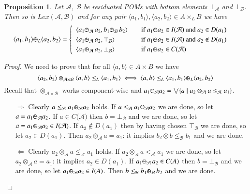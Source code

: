 \documentclass[a4paper]{elsarticle}
\newtheorem{proposition}{Proposition}
\newcommand{\1}{\mathbf{1}}
\def\odiv{{ \ominus\hspace{-8pt}:}\;}
\begin{document}
\begin{proposition}\label{def:resBI}
Let $\mathcal{A}$, $\mathcal{B}$ be residuated POMs with bottom elements $\bot_\mathcal{A}$ and $\bot_\mathcal{B}$.
%
Then so is $Lex(\mathcal{A}, \mathcal{B})$ and for any pair $\langle a_1, b_1\rangle, \langle a_2, b_2\rangle \in A \times_L B$
we have 
\[
	\langle a_1, b_1\rangle \odiv_L \langle a_2, b_2\rangle = 	\begin{cases}
	\begin{array}{lcl}
	\langle a_1 \odiv_\mathcal{A} \, a_2, b_1  \odiv_\mathcal{B} \, b_2\rangle 
	& & \mbox{if  }  a_1 \odiv a_2 \in I(\mathcal{A}) \mbox{ and } a_2 \in D(a_1)\\
	\langle a_1 \odiv_\mathcal{A} \, a_2, \top_\mathcal{B} \rangle 
	& & \mbox{if  } a_1 \odiv a_2 \in I(\mathcal{A}) \mbox{ and } a_2 \not \in D(a_1) \\
	\langle a_1 \odiv_\mathcal{A} \, a_2, \bot_\mathcal{B} \rangle 
	& & \mbox{if  }  a_1 \odiv a_2 \in C(\mathcal{A}) 
	\end{array}
	\end{cases}
\]
\end{proposition}
\begin{proof}
We need to prove that for all $\langle a, b\rangle \in A\times B$ we have
$$\langle a_2, b_2\rangle \otimes_{\mathcal{A} \times \mathcal{B}} \langle a, b\rangle \leq_L \langle a_1, b_1\rangle
\iff \langle a, b\rangle \leq_L  \langle a_1, b_1\rangle \odiv_L \langle a_2, b_2\rangle$$
%
Recall that $\otimes_{\mathcal{A} \times \mathcal{B}}$ works component-wise and 
$a_1 \odiv_\mathcal{A} a_2 = \bigvee \{a \mid a_2 \otimes_\mathcal{A} a \leq_\mathcal{A} a_1\}$.

\begin{itemize}
\item[$\Rightarrow$] Clearly $a \leq_\mathcal{A} a_1 \odiv_\mathcal{A} a_2$ holds.
If $a <_\mathcal{A} a_1 \odiv_\mathcal{A} a_2$ we are done, so let 
$a = a_1 \odiv_\mathcal{A} a_2$. If $a \in C(\mathcal{A)}$ then 
$b = \bot_\mathcal{B}$ and we are done, so let $a = a_1 \odiv_\mathcal{A} a_2 \in I(\mathcal{A)}$.
If $a_2 \not \in D(a_1)$ then by having chosen $\top_\mathcal{B}$ we are done, so let $a_2 \in D(a_1)$.
Then $a_2 \otimes_\mathcal{A} a = a_1$: it implies $b_2 \otimes b \leq_\mathcal{B} b_1$
and we are done.

\item[$\Leftarrow$]
Clearly $a_2 \otimes_\mathcal{A} a \leq_\mathcal{A} a_1$ holds.
If $a_2 \otimes_\mathcal{A} a <_\mathcal{A} a_1$ we are done, so let 
$a_2 \otimes_\mathcal{A} a = a_1$: it implies $a_2 \in D(a_1)$.
If $a_1 \odiv_\mathcal{A} \, a_2 \in C(A)$ then $b = \bot_\mathcal{B}$ and we are done, so let
$a_1 \odiv_\mathcal{A} a_2 \in I(A)$. Then $b\leq_\mathcal{B} b_1 \odiv_\mathcal{B} \, b_2$
and we are done.
\end{itemize}
\end{proof}
\end{document}
